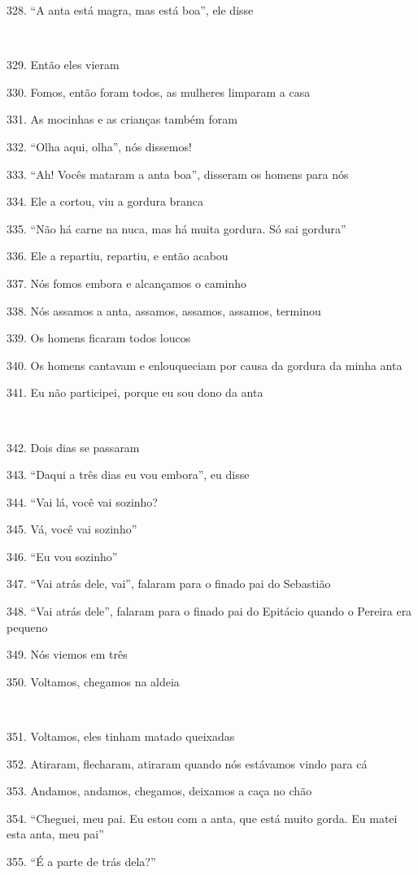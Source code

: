 328. ``A anta está magra, mas está boa'', ele disse

~

329. Então eles vieram

330. Fomos, então foram todos, as mulheres limparam a casa

331. As mocinhas e as crianças também foram

332. ``Olha aqui, olha'', nós dissemos!

333. ``Ah! Vocês mataram a anta boa'', disseram os homens para nós

334. Ele a cortou, viu a gordura branca

335. ``Não há carne na nuca, mas há muita gordura. Só sai gordura''

336. Ele a repartiu, repartiu, e então acabou

337. Nós fomos embora e alcançamos o caminho

338. Nós assamos a anta, assamos, assamos, assamos, terminou

339. Os homens ficaram todos loucos

340. Os homens cantavam e enlouqueciam por causa da gordura da minha anta

341. Eu não participei, porque eu sou dono da anta

~

342. Dois dias se passaram

343. ``Daqui a três dias eu vou embora'', eu disse

344. ``Vai lá, você vai sozinho?

345. Vá, você vai sozinho''

346. ``Eu vou sozinho''

347. ``Vai atrás dele, vai'', falaram para o finado pai do Sebastião

348. ``Vai atrás dele'', falaram para o finado pai do Epitácio quando o
Pereira era pequeno

349. Nós viemos em três

350. Voltamos, chegamos na aldeia

~

351. Voltamos, eles tinham matado queixadas

352. Atiraram, flecharam, atiraram quando nós estávamos vindo para cá

353. Andamos, andamos, chegamos, deixamos a caça no chão

354. ``Cheguei, meu pai. Eu estou com a anta, que está muito gorda. Eu matei esta anta, meu pai''

355. ``É a parte de trás dela?''


